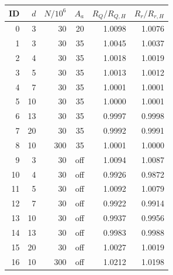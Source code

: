 \begin{tabular}{rrrrrr}
\hline\hline
ID & $d$ & $N/10^6$ & $A_a$ & $R_Q/R_{Q,H}$ & $R_r/R_{r,H}$ \\
\hline
0 & 3 & 30 & 20 & 1.0098 & 1.0076 \\
1 & 3 & 30 & 35 & 1.0045 & 1.0037 \\
2 & 4 & 30 & 35 & 1.0018 & 1.0019 \\
3 & 5 & 30 & 35 & 1.0013 & 1.0012 \\
4 & 7 & 30 & 35 & 1.0001 & 1.0001 \\
5 & 10 & 30 & 35 & 1.0000 & 1.0001 \\
6 & 13 & 30 & 35 & 0.9997 & 0.9998 \\
7 & 20 & 30 & 35 & 0.9992 & 0.9991 \\
8 & 10 & 300 & 35 & 1.0001 & 1.0000 \\
9 & 3 & 30 & off & 1.0094 & 1.0087 \\
10 & 4 & 30 & off & 0.9926 & 0.9872 \\
11 & 5 & 30 & off & 1.0092 & 1.0079 \\
12 & 7 & 30 & off & 0.9922 & 0.9914 \\
13 & 10 & 30 & off & 0.9937 & 0.9956 \\
14 & 13 & 30 & off & 0.9983 & 0.9988 \\
15 & 20 & 30 & off & 1.0027 & 1.0019 \\
16 & 10 & 300 & off & 1.0212 & 1.0198 \\
\hline\hline
\end{tabular}
